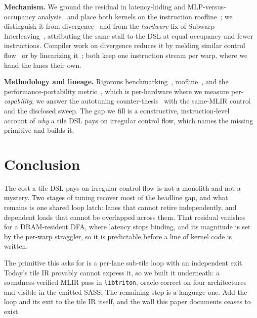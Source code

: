 \documentclass[sigplan,screen,review,anonymous]{acmart}
\begin{document}
\textbf{Mechanism.} We ground the residual in latency-hiding and MLP-versus-occupancy
analysis~\cite{volkov2016latency,hongkim2009} and place both kernels on the instruction
roofline~\cite{instroofline2022}; we distinguish it from divergence~\cite{fung2007} and
from the \emph{hardware} fix of Subwarp Interleaving~\cite{subwarp2022}, attributing the
same stall to the DSL at equal occupancy and fewer instructions. Compiler work on
divergence reduces it by melding similar control flow~\cite{darm2022} or by linearizing
it~\cite{partialcfg2018}; both keep one instruction stream per warp, where we hand the
lanes their own.

\textbf{Methodology and lineage.} Rigorous benchmarking~\cite{hoefler2015},
roofline~\cite{roofline2009}, and the performance-portability metric~\cite{pennycook2016},
which is per-hardware where we measure per-\emph{capability}; we answer the autotuning
counter-thesis~\cite{ringlein2025} with the same-MLIR control and the disclosed sweep. The
gap we fill is a constructive, instruction-level account of \emph{why} a tile DSL pays on
irregular control flow, which names the missing primitive and builds it.

\section{Conclusion}
The cost a tile DSL pays on irregular control flow is not a monolith and not a mystery. Two
stages of tuning recover most of the headline gap, and what remains is one shared loop
latch: lanes that cannot retire independently, and dependent loads that cannot be
overlapped across them. That residual vanishes for a DRAM-resident DFA, where latency stops
binding, and its magnitude is set by the per-warp straggler, so it is predictable before a
line of kernel code is written.

The primitive this asks for is a per-lane sub-tile loop with an independent exit. Today's
tile IR provably cannot express it, so we built it underneath: a soundness-verified MLIR
pass in \texttt{libtriton}, oracle-correct on four architectures and visible in the emitted
SASS. The remaining step is a language one. Add the loop and its exit to the tile IR itself,
and the wall this paper documents ceases to exist.

\clearpage
\end{document}
